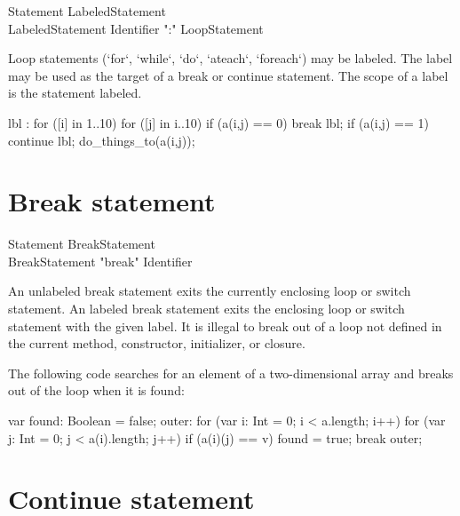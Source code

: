 \begin{grammar}
Statement \: LabeledStatement \\
LabeledStatement \: Identifier \xcd":" LoopStatement \\
\end{grammar}

Loop statements (\xcd`for`, \xcd`while`, \xcd`do`, \xcd`ateach`,
\xcd`foreach`) may be labeled. The label may be used as the target of a break
or continue statement. The scope of a label is the statement labeled.
\begin{xten}
lbl : for ([i] in 1..10) {
   for ([j] in i..10) {  
      if (a(i,j) == 0) break lbl;
      if (a(i,j) == 1) continue lbl;
      do_things_to(a(i,j)); 
   }
}
\end{xten}


\section{Break statement}

\begin{grammar}
Statement \: BreakStatement \\
BreakStatement \: \xcd"break" Identifier\opt \\
\end{grammar}

An unlabeled break statement exits the currently enclosing loop or switch
statement. An labeled break statement exits the enclosing loop or switch
statement with the given label.
It is illegal to break out of a loop not defined in the current
method, constructor, initializer, or closure.  

The following code searches for an element of a two-dimensional
array and breaks out of the loop when it is found:

\begin{xten}
var found: Boolean = false;
outer: for (var i: Int = 0; i < a.length; i++)
    for (var j: Int = 0; j < a(i).length; j++)
        if (a(i)(j) == v) {
            found = true;
            break outer;
        }
\end{xten}

\section{Continue statement}


